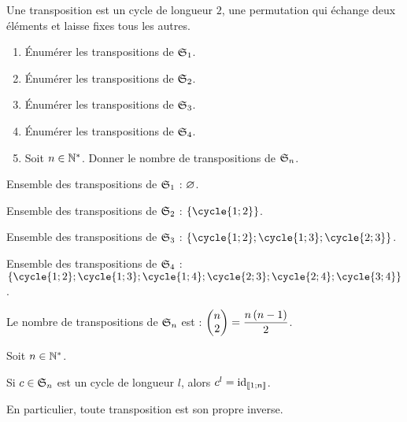 \begin{defi}[Transposition]
Une transposition est un cycle de longueur \(2\), \cad une permutation qui échange deux éléments et laisse fixes tous les autres.
\end{defi}

\begin{exoex}[Transpositions]
\begin{enumerate}
    \item Énumérer les transpositions de \(\S{1}\). \\
    \item Énumérer les transpositions de \(\S{2}\). \\
    \item Énumérer les transpositions de \(\S{3}\). \\
    \item Énumérer les transpositions de \(\S{4}\). \\
    \item Soit \(n\in\Ns\). Donner le nombre de transpositions de \(\S{n}\).
\end{enumerate}
\end{exoex}

\begin{corr}
Ensemble des transpositions de \(\S{1}\) : \(\ensvide\).

Ensemble des transpositions de \(\S{2}\) : \(\accol{\cycle{1;2}}\).

Ensemble des transpositions de \(\S{3}\) : \(\accol{\cycle{1;2};\cycle{1;3};\cycle{2;3}}\).

Ensemble des transpositions de \(\S{4}\) : \(\accol{\cycle{1;2};\cycle{1;3};\cycle{1;4};\cycle{2;3};\cycle{2;4};\cycle{3;4}}\).

Le nombre de transpositions de \(\S{n}\) est : \(\binom{2}{n}=\dfrac{n\paren{n-1}}{2}\).
\end{corr}

\begin{rem}
Soit \(n\in\Ns\).

Si \(c\in\S{n}\) est un cycle de longueur \(l\), alors \(c^l=\id{\interventierii{1}{n}}\).

En particulier, toute transposition est son propre inverse.
\end{rem}